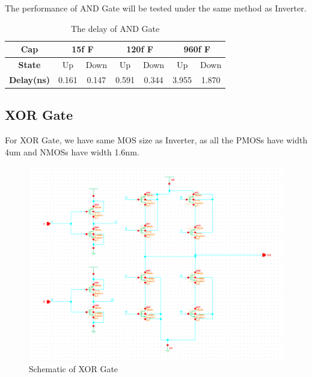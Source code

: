 \documentclass[conference]{IEEEtran}
\begin{document}
The performance of AND Gate will be tested under the same method as Inverter.

\begin{table}[h]
    \caption{The delay of AND Gate}
    \begin{center}
        \begin{tabular}{|c|c|c|c|c|c|c|}
            \hline
            \textbf{Cap} & \multicolumn{2}{|c|}{15f F} & \multicolumn{2}{|c|}{120f F} & \multicolumn{2}{|c|}{960f F} \\
            \hline
            \textbf{State} & Up & Down & Up & Down & Up & Down \\
            \hline
            
            \textbf{Delay(ns)} & 0.161  & 0.147 & 0.591 & 0.344 & 3.955 & 1.870 \\
            \hline
        \end{tabular}
    \end{center}
    \label{The delay of AND}
\end{table}

\subsection{XOR Gate}

For XOR Gate, we have same MOS size as Inverter, as all the PMOSs have width 4um and NMOSs have width 1.6nm.

\begin{figure}[H]
    \centering
    \includegraphics[width = 0.9\linewidth]{xor2_schematic.png}
    \caption{Schematic of XOR Gate}
    \label{Schematic of XOR Gate}
\end{figure}
\end{document}
